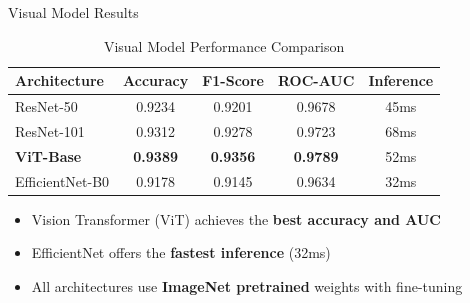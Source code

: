 \documentclass[aspectratio=169,12pt]{beamer}
\begin{document}
\begin{frame}{Visual Model Results}
    \begin{table}
        \centering
        \small
        \begin{tabular}{lcccc}
            \toprule
            \textbf{Architecture} & \textbf{Accuracy} & \textbf{F1-Score} & \textbf{ROC-AUC} & \textbf{Inference} \\
            \midrule
            ResNet-50 & 0.9234 & 0.9201 & 0.9678 & 45ms \\
            ResNet-101 & 0.9312 & 0.9278 & 0.9723 & 68ms \\
            \textbf{ViT-Base} & \textbf{0.9389} & \textbf{0.9356} & \textbf{0.9789} & 52ms \\
            EfficientNet-B0 & 0.9178 & 0.9145 & 0.9634 & 32ms \\
            \bottomrule
        \end{tabular}
        \caption{Visual Model Performance Comparison}
    \end{table}
    \vspace{0.3cm}
    \begin{itemize}
        \item Vision Transformer (ViT) achieves the \textbf{best accuracy and AUC}
        \item EfficientNet offers the \textbf{fastest inference} (32ms)
        \item All architectures use \textbf{ImageNet pretrained} weights with fine-tuning
    \end{itemize}
\end{frame}
\end{document}
